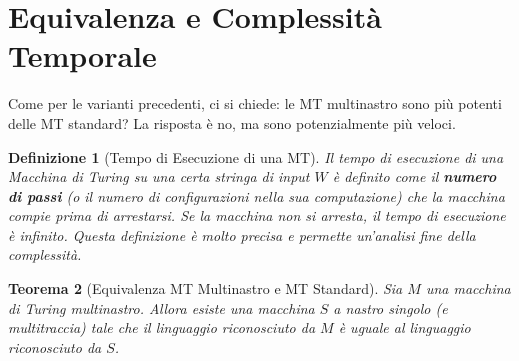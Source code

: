 \documentclass[a4paper, 11pt]{book} %
\newtheorem{theorem}{Teorema}[section]
\newtheorem{definition}[theorem]{Definizione}
\theoremstyle{definition}
\begin{document}
\section{Equivalenza e Complessità Temporale}
Come per le varianti precedenti, ci si chiede: le MT multinastro sono più potenti delle MT standard? La risposta è no, ma sono potenzialmente più veloci.

\begin{definition}[Tempo di Esecuzione di una MT]
Il tempo di esecuzione di una Macchina di Turing su una certa stringa di input $W$ è definito come il \textbf{numero di passi} (o il numero di configurazioni nella sua computazione) che la macchina compie prima di arrestarsi. Se la macchina non si arresta, il tempo di esecuzione è infinito. Questa definizione è molto precisa e permette un'analisi fine della complessità.
\end{definition}

\begin{theorem}[Equivalenza MT Multinastro e MT Standard]
Sia $M$ una macchina di Turing multinastro. Allora esiste una macchina $S$ a nastro singolo (e multitraccia) tale che il linguaggio riconosciuto da $M$ è uguale al linguaggio riconosciuto da $S$.
\end{theorem}
\end{document}
